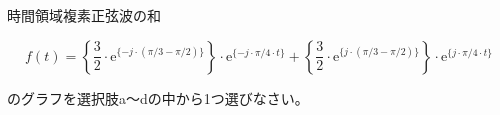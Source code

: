 時間領域複素正弦波の和

\[
f(t) =
\left \{ \frac{3}{2} \cdot \textrm{e}^{\{-j \cdot (\pi/3 - \pi/2) \}} \right \} \cdot \textrm{e}^{\{-j \cdot \pi/4 \cdot t \}} +  
\left \{ \frac{3}{2} \cdot \textrm{e}^{\{ j \cdot (\pi/3 - \pi/2) \}} \right \} \cdot \textrm{e}^{\{j \cdot \pi/4 \cdot t \}}
\]

\bigskip
\noindent  のグラフを選択肢a〜dの中から1つ選びなさい。
